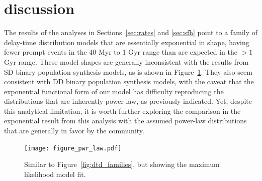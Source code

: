 \documentclass[apj, linenumbers]{aastex62}
\begin{document}
\section{discussion}\label{sec:discussion}
The results of the analyses in Sections~\ref{sec:rates} and \ref{sec:sfh} point to a family of delay-time distribution models that are essentially exponential in shape, having fewer prompt events in the 40 Myr to 1 Gyr range than are expected in the $>1$ Gyr range. These model shapes are generally inconsistent with the results from SD binary population synthesis models, as is shown in Figure~\ref{fig:dtd_eval}. They also seem consistent with DD binary population synthesis models, with the caveat that the exponential functional form of our model has difficulty reproducing the distributions that are inherently power-law, as previously indicated. Yet, despite this analytical limitation, it is worth further exploring the comparison in the exponential result from this analysis with the assumed power-law distributions that are generally in favor by the community.
\begin{figure}[t]
   \centering
   \texttt{[image: figure\_pwr\_law.pdf]}
   \caption{\footnotesize Similar to Figure~\ref{fig:dtd_families}, but showing the maximum likelihood model fit.}
   \label{fig:dtd_eval}
\end{figure}
\end{document}

